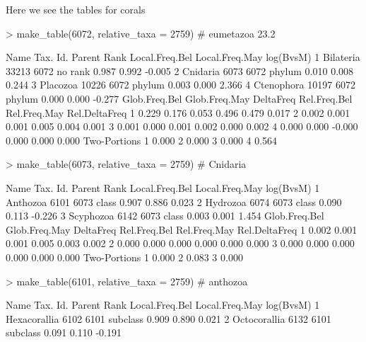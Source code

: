 \documentclass{article}
\begin{document}
Here we see the tables for corals
\begin{Schunk}
\begin{Sinput}
> make_table(6072, relative_taxa = 2759) # eumetazoa  23.2% B and 17.7% M
\end{Sinput}
\begin{Soutput}
        Name Tax. Id. Parent    Rank Local.Freq.Bel Local.Freq.May log(BvsM)
1  Bilateria    33213   6072 no rank          0.987          0.992    -0.005
2   Cnidaria     6073   6072  phylum          0.010          0.008     0.244
3   Placozoa    10226   6072  phylum          0.003          0.000     2.366
4 Ctenophora    10197   6072  phylum          0.000          0.000    -0.277
  Glob.Freq.Bel Glob.Freq.May DeltaFreq Rel.Freq.Bel Rel.Freq.May Rel.DeltaFreq
1         0.229         0.176     0.053        0.496        0.479         0.017
2         0.002         0.001     0.001        0.005        0.004         0.001
3         0.001         0.000     0.001        0.002        0.000         0.002
4         0.000         0.000    -0.000        0.000        0.000         0.000
  Two-Portions
1        0.000
2        0.000
3        0.000
4        0.564
\end{Soutput}
\begin{Sinput}
> make_table(6073, relative_taxa = 2759) # Cnidaria
\end{Sinput}
\begin{Soutput}
       Name Tax. Id. Parent  Rank Local.Freq.Bel Local.Freq.May log(BvsM)
1  Anthozoa     6101   6073 class          0.907          0.886     0.023
2  Hydrozoa     6074   6073 class          0.090          0.113    -0.226
3 Scyphozoa     6142   6073 class          0.003          0.001     1.454
  Glob.Freq.Bel Glob.Freq.May DeltaFreq Rel.Freq.Bel Rel.Freq.May Rel.DeltaFreq
1         0.002         0.001     0.001        0.005        0.003         0.002
2         0.000         0.000     0.000        0.000        0.000         0.000
3         0.000         0.000     0.000        0.000        0.000         0.000
  Two-Portions
1        0.000
2        0.083
3        0.000
\end{Soutput}
\begin{Sinput}
> make_table(6101, relative_taxa = 2759) # anthozoa
\end{Sinput}
\begin{Soutput}
          Name Tax. Id. Parent     Rank Local.Freq.Bel Local.Freq.May log(BvsM)
1 Hexacorallia     6102   6101 subclass          0.909          0.890     0.021
2 Octocorallia     6132   6101 subclass          0.091          0.110    -0.191

\end{Soutput}
\end{Schunk}
\end{document}
